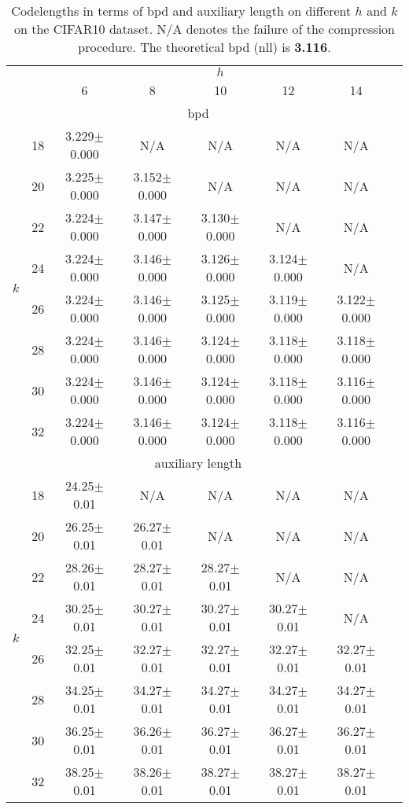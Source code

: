 \documentclass{article}
\newcommand{\ebar}[1]{{\tiny $\pm$#1}}
\begin{document}
\begin{table}[ht]
\centering
\caption{Codelengths in terms of bpd and auxiliary length on different $h$ and $k$ on the CIFAR10 dataset. N/A denotes the failure of the compression procedure. The theoretical bpd (nll) is \textbf{3.116}.}
\small
\label{tab:hparam_c10}
\begin{tabular}{cccccccc}
\toprule
    & & \multicolumn{5}{c}{$h$} \\
     &  & 6 & 8 & 10 & 12 & 14 \\
    \midrule
    \multicolumn{7}{c}{bpd} \\
    \midrule
    \multirow{8}{*}{$k$} & 18 & 3.229\ebar{0.000} & N/A & N/A & N/A & N/A \\
        & 20 & 3.225\ebar{0.000} & 3.152\ebar{0.000} & N/A & N/A & N/A \\
        & 22 & 3.224\ebar{0.000} & 3.147\ebar{0.000} & 3.130\ebar{0.000} & N/A & N/A \\
        & 24 & 3.224\ebar{0.000} & 3.146\ebar{0.000} & 3.126\ebar{0.000} & 3.124\ebar{0.000} & N/A \\
        & 26 & 3.224\ebar{0.000} & 3.146\ebar{0.000} & 3.125\ebar{0.000} & 3.119\ebar{0.000} & 3.122\ebar{0.000} \\
        & 28 & 3.224\ebar{0.000} & 3.146\ebar{0.000} & 3.124\ebar{0.000} & 3.118\ebar{0.000} & 3.118\ebar{0.000} \\
        & 30 & 3.224\ebar{0.000} & 3.146\ebar{0.000} & 3.124\ebar{0.000} & 3.118\ebar{0.000} & 3.116\ebar{0.000} \\
        & 32 & 3.224\ebar{0.000} & 3.146\ebar{0.000} & 3.124\ebar{0.000} & 3.118\ebar{0.000} & 3.116\ebar{0.000} \\
    \midrule
    \multicolumn{7}{c}{auxiliary length} \\
    \midrule
    \multirow{8}{*}{$k$} & 18 & 24.25\ebar{0.01} & N/A & N/A & N/A & N/A \\
        & 20 & 26.25\ebar{0.01} & 26.27\ebar{0.01} & N/A & N/A & N/A \\
        & 22 & 28.26\ebar{0.01} & 28.27\ebar{0.01} & 28.27\ebar{0.01} & N/A & N/A \\
        & 24 & 30.25\ebar{0.01} & 30.27\ebar{0.01} & 30.27\ebar{0.01} & 30.27\ebar{0.01} & N/A \\
        & 26 & 32.25\ebar{0.01} & 32.27\ebar{0.01} & 32.27\ebar{0.01} & 32.27\ebar{0.01} & 32.27\ebar{0.01} \\
        & 28 & 34.25\ebar{0.01} & 34.27\ebar{0.01} & 34.27\ebar{0.01} & 34.27\ebar{0.01} & 34.27\ebar{0.01} \\
        & 30 & 36.25\ebar{0.01} & 36.26\ebar{0.01} & 36.27\ebar{0.01} & 36.27\ebar{0.01} & 36.27\ebar{0.01} \\
        & 32 & 38.25\ebar{0.01} & 38.26\ebar{0.01} & 38.27\ebar{0.01} & 38.27\ebar{0.01} & 38.27\ebar{0.01} \\
\bottomrule
\end{tabular}
\end{table}
\end{document}
